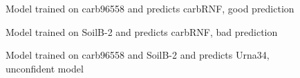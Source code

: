 \documentclass[review]{elsarticle}
\begin{document}
\begin{figure}[h]
	\caption{Model trained on carb96558 and predicts carbRNF, good prediction}
	\label{Results:visual_good_carbRNF}
\end{figure}

\begin{figure}[h]
	\caption{Model trained on SoilB-2 and predicts carbRNF, bad prediction}
	\label{Results:visual_bad_carbRNF}
\end{figure}

\begin{figure}[h]
	\caption{Model trained on carb96558 and SoilB-2 and predicts Urna34, unconfident model}
	\label{Results:visual_unconfident}
\end{figure}
\end{document}
